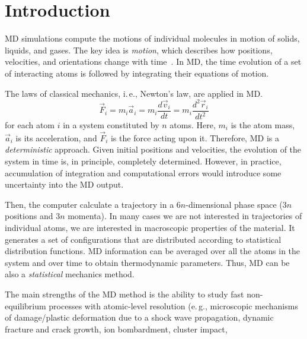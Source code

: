 \documentclass[a4paper,10pt,technote,compsoc,onecolumn]{IEEEtran}
\newcommand{\ie}{i.\,e., }
\newcommand{\eg}{e.\,g., }
\numberwithin{equation}{section}
\begin{document}
%
\IEEEpeerreviewmaketitle



\section{Introduction}
\ac{MD} simulations compute the motions of individual molecules in motion of
solids, liquids, and gases. The key idea is {\em motion}, which describes how
positions, velocities, and orientations change with time~\cite{haile97mds,
furio97primer}. In \ac{MD}, the time evolution of a set of interacting atoms
is followed by integrating their equations of motion.

The laws of classical mechanics, \ie Newton's law, are applied in \ac{MD}.
\begin{equation}
  \vec{F}_i = m_i\vec{a}_i = m_i\frac{d\vec{v}_i}{dt} =
  m_i\frac{d^2\vec{r}_i}{dt^2}
\end{equation}
for each atom $i$ in a system constituted by $n$ atoms. Here, $m_i$ is the
atom mass, $\vec{a}_i$ is its acceleration, and $\vec{F}_i$ is the force
acting upon it.
Therefore, \ac{MD} is a {\em deterministic} approach. Given initial positions
and velocities, the evolution of the system in time is, in principle,
completely determined.  However, in practice, accumulation of integration and
computational errors would introduce some uncertainty into the \ac{MD} output.

Then, the computer calculate a trajectory in a $6n$-dimensional phase space
($3n$ positions and $3n$ momenta). In many cases we are not interested in
trajectories of individual atoms, we are interested in macroscopic properties
of the material. It generates a set of configurations that are distributed
according to statistical distribution functions.  \ac{MD} information can be
averaged over all the atoms in the system and over time to obtain
thermodynamic parameters. Thus, \ac{MD} can be also a {\em statistical}
mechanics method.

The main strengths of the MD method is the ability to study fast
non-equilibrium processes with atomic-level resolution (\eg microscopic
mechanisms of damage/plastic deformation due to a shock wave propagation,
dynamic fracture and crack growth, ion bombardment, cluster impact,
\end{document}
